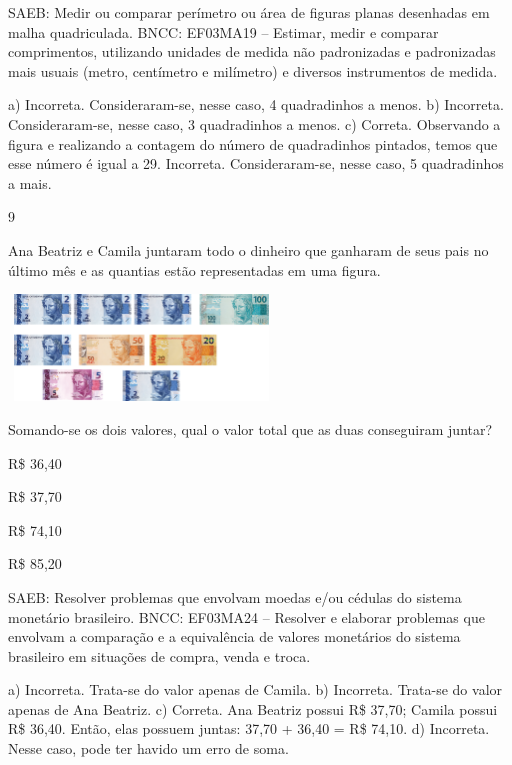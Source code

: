 {\begin{escolha}
{SAEB: Medir ou comparar perímetro ou área de figuras planas
desenhadas em malha quadriculada.
BNCC: EF03MA19 -- Estimar, medir e comparar comprimentos, utilizando unidades de medida
não padronizadas e padronizadas mais usuais (metro, centímetro e milímetro) e diversos
instrumentos de medida.

a) Incorreta. Consideraram-se, nesse caso, 4 quadradinhos a menos.
b) Incorreta. Consideraram-se, nesse caso, 3 quadradinhos a menos.
c) Correta. Observando a figura e realizando a contagem do número de quadradinhos
pintados, temos que esse número é igual a 29.
Incorreta. Consideraram-se, nesse caso, 5 quadradinhos a mais.

\num{9}

Ana Beatriz e Camila juntaram todo o dinheiro que ganharam de seus pais no
último mês e as quantias estão representadas em uma figura.


\includegraphics[width=2.77564in,height=1.11703in]{media/image110.png}


Somando-se os dois valores, qual o valor total que as duas conseguiram juntar?

\begin{escolha}
\item
  R\$ 36,40
\item
  R\$ 37,70
\item
  R\$ 74,10
\item
  R\$ 85,20
\end{escolha}

SAEB: Resolver problemas que envolvam moedas e/ou cédulas do
sistema monetário brasileiro.
BNCC: EF03MA24 -- Resolver e elaborar problemas que envolvam a comparação e a equivalência de
valores monetários do sistema brasileiro em situações de compra, venda e troca.

a) Incorreta. Trata-se do valor apenas de Camila.
b) Incorreta. Trata-se do valor apenas de Ana Beatriz.
c) Correta. Ana Beatriz possui R\$ 37,70; Camila possui R\$ 36,40. Então, elas possuem juntas: 37,70 + 36,40 = R\$ 74,10.
d) Incorreta. Nesse caso, pode ter havido um erro de soma.

}
\end{escolha}}

